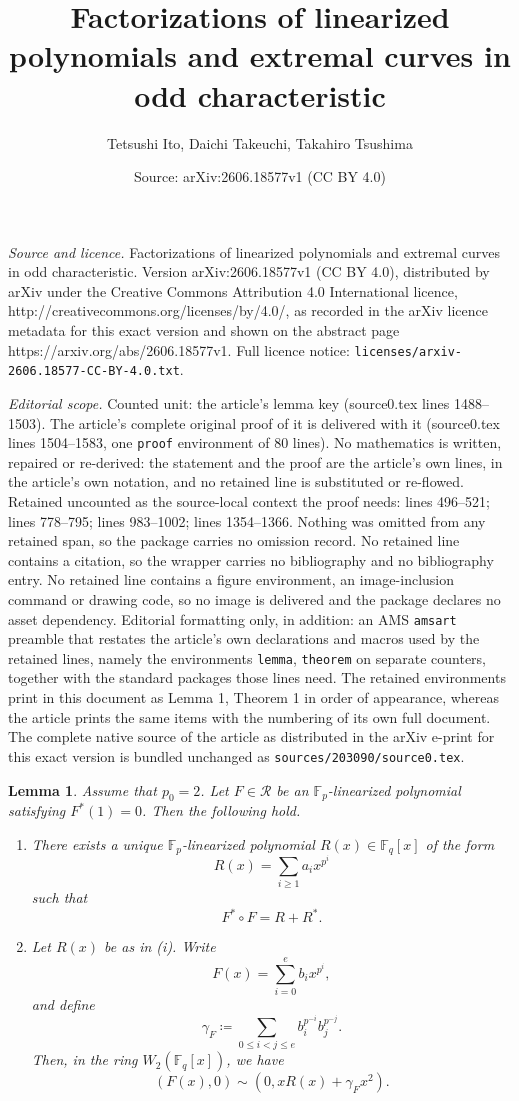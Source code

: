 \documentclass[10pt,a4paper]{amsart}
\title{Factorizations of linearized polynomials and extremal curves in odd characteristic}
\author{Tetsushi Ito, Daichi Takeuchi, Takahiro Tsushima}
\date{Source: arXiv:2606.18577v1 (CC BY 4.0)}
\newtheorem{lemma}{Lemma}
\def\F{{\mathbb F}}
\newcommand{\mc}{\mathcal}
\begin{document}
\maketitle

\noindent\emph{Source and licence.} Factorizations of linearized polynomials and extremal curves in odd characteristic. Version arXiv:2606.18577v1 (CC BY 4.0), distributed by arXiv under the Creative Commons Attribution 4.0 International licence, http://creativecommons.org/licenses/by/4.0/, as recorded in the arXiv licence metadata for this exact version and shown on the abstract page https://arxiv.org/abs/2606.18577v1. Full licence notice: \texttt{licenses/arxiv-2606.18577-CC-BY-4.0.txt}.\par\smallskip

\noindent\textit{Editorial scope.} Counted unit: the article's lemma key (source0.tex lines 1488--1503). The article's complete original proof of it is delivered with it (source0.tex lines 1504--1583, one \texttt{proof} environment of 80 lines). No mathematics is written, repaired or re-derived: the statement and the proof are the article's own lines, in the article's own notation, and no retained line is substituted or re-flowed.  Retained uncounted as the source-local context the proof needs: lines 496--521; lines 778--795; lines 983--1002; lines 1354--1366.  Nothing was omitted from any retained span, so the package carries no omission record.  No retained line contains a citation, so the wrapper carries no bibliography and no bibliography entry.  No retained line contains a figure environment, an image-inclusion command or drawing code, so no image is delivered and the package declares no asset dependency.  Editorial formatting only, in addition: an AMS \texttt{amsart} preamble that restates the article's own declarations and macros used by the retained lines, namely the environments \texttt{lemma}, \texttt{theorem} on separate counters, together with the standard packages those lines need.  The retained environments print in this document as Lemma 1, Theorem 1 in order of appearance, whereas the article prints the same items with the numbering of its own full document.  The complete native source of the article as distributed in the arXiv e-print for this exact version is bundled unchanged as \texttt{sources/203090/source0.tex}.
\begin{lemma}\label{lem: Fast F=R+Rast}
Assume that $p_0=2$. 
Let $F\in\mc R$ be an $\F_p$-linearized polynomial satisfying $F^\ast(1)=0$. Then the following hold. 
\begin{enumerate}
    \item There exists a unique $\F_p$-linearized polynomial $R(x)\in \F_q[x]$ of the form 
    \[
    R(x)=\sum_{i\geq1}a_ix^{p^i}\]
    such that 
\begin{equation*}
F^\ast \circ F=R+R^\ast. 
\end{equation*}
\item 
Let $R(x)$ be as in {\rm (i)}. Write 
\[
F(x)=\sum_{i=0}^eb_ix^{p^i}, 
\]
and define 
\[
\gamma_F\coloneqq\sum_{0\le i<j\le e}b_i^{p^{-i}}b_j^{p^{-j}}. 
\]
Then, in the ring $W_2(\F_q[x])$, we have 
\[
(F(x),0)\sim (0,x R(x)+\gamma_Fx^2). 
\]
\end{enumerate}
\end{lemma}
\end{document}
